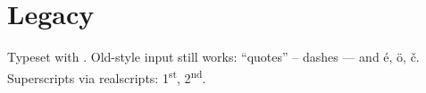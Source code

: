 \documentclass{article}
\begin{document}
\section{Legacy}
Typeset with \XeLaTeX. Old-style input still works: ``quotes'' -- dashes --- and \'{e}, \"{o}, \v{c}.
Superscripts via realscripts: 1\textsuperscript{st}, 2\textsuperscript{nd}.
\end{document}
